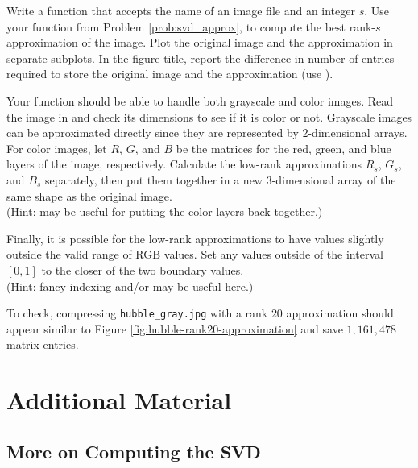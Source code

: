 \begin{problem} %
Write a function that accepts the name of an image file and an integer $s$.
Use your function from Problem \ref{prob:svd_approx}, to compute the best rank-$s$ approximation of the image.
Plot the original image and the approximation in separate subplots.
In the figure title, report the difference in number of entries required to store the original image and the approximation (use ).

Your function should be able to handle both grayscale and color images.
Read the image in and check its dimensions to see if it is color or not.
Grayscale images can be approximated directly since they are represented by 2-dimensional arrays.
For color images, let $R$, $G$, and $B$ be the matrices for the red, green, and blue layers of the image, respectively.
Calculate the low-rank approximations $R_s$, $G_s$, and $B_s$ separately, then put them together in a new 3-dimensional array of the same shape as the original image.
\\ (Hint:  may be useful for putting the color layers back together.)

Finally, it is possible for the low-rank approximations to have values slightly outside the valid range of RGB values.
Set any values outside of the interval $[0,1]$ to the closer of the two boundary values.
\\ (Hint: fancy indexing and/or  may be useful here.)

To check, compressing \texttt{hubble\_gray.jpg} with a rank $20$ approximation should appear similar to Figure \ref{fig:hubble-rank20-approximation} and save $1,161,478$ matrix entries.
\end{problem}


\newpage

\section*{Additional Material} %

\subsection*{More on Computing the SVD} %

